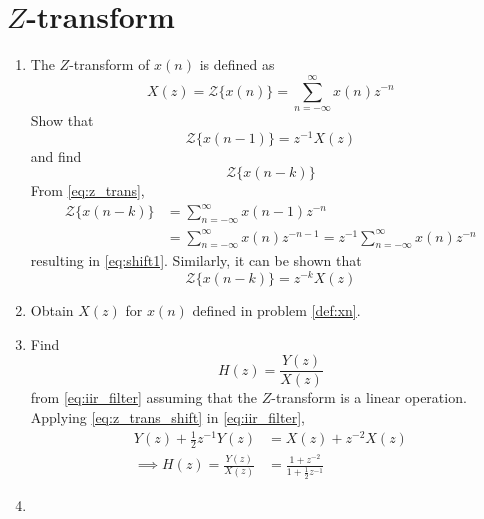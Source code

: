 \documentclass[journal,12pt,twocolumn]{IEEEtran}
\renewcommand\thesection{\arabic{section}}
\begin{document}
	\section{$Z$-transform}
	\begin{enumerate}[label=\thesection.\arabic*]
		\item The $Z$-transform of $x(n)$ is defined as
		\begin{equation}
			\label{eq:z_trans}
			X(z)={\mathcal {Z}}\{x(n)\}=\sum _{n=-\infty }^{\infty }x(n)z^{-n}
		\end{equation}
		Show that
		\begin{equation}
			\label{eq:shift1}
			{\mathcal {Z}}\{x(n-1)\} = z^{-1}X(z)
		\end{equation}
		and find
		\begin{equation}
			{\mathcal {Z}}\{x(n-k)\} 
		\end{equation}
		\solution From \eqref{eq:z_trans},
		\begin{align}
			{\mathcal {Z}}\{x(n-k)\} &=\sum _{n=-\infty }^{\infty }x(n-1)z^{-n}
			\\
			&=\sum _{n=-\infty }^{\infty }x(n)z^{-n-1} = z^{-1}\sum _{n=-\infty }^{\infty }x(n)z^{-n}
		\end{align}
		resulting in \eqref{eq:shift1}. Similarly, it can be shown that
		\begin{equation}
			\label{eq:z_trans_shift}
			{\mathcal {Z}}\{x(n-k)\} = z^{-k}X(z)
		\end{equation}
		\item Obtain $X(z)$ for $x(n)$ defined in problem 
		\ref{def:xn}.
		\item Find
		\begin{equation}
			H(z) = \frac{Y(z)}{X(z)}
		\end{equation}
		from  \eqref{eq:iir_filter} assuming that the $Z$-transform is a linear operation.
		\\
		\solution  Applying \eqref{eq:z_trans_shift} in \eqref{eq:iir_filter},
		\begin{align}
			Y(z) + \frac{1}{2}z^{-1}Y(z) &= X(z)+z^{-2}X(z)
			\\
			\implies H(z) = \frac{Y(z)}{X(z)} &= \frac{1 + z^{-2}}{1 + \frac{1}{2}z^{-1}}
			\label{eq:freq_resp}
		\end{align}
		\item 
		\begin{enumerate}
			

\end{enumerate}
\end{enumerate}
\end{document}
